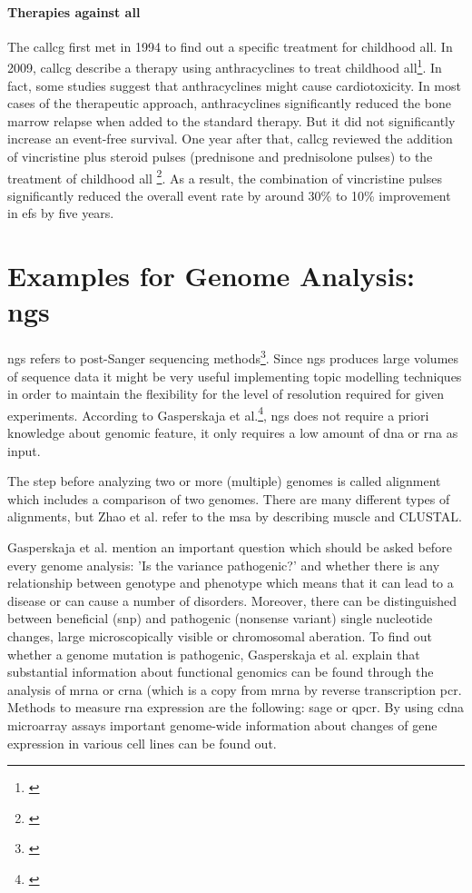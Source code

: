 \paragraph{Therapies against \gls{all}}
The \gls{callcg} first met in 1994 to find out a specific treatment for childhood \gls{all}.
In 2009, \gls{callcg} describe a therapy using anthracyclines to treat childhood \gls{all}\footnote{\autocite{callcg_2009}}. In fact, some studies suggest that anthracyclines might cause cardiotoxicity. In most cases of the therapeutic approach, anthracyclines significantly reduced the bone marrow relapse when added to the standard therapy. But it did not significantly increase an event-free survival.
One year after that, \gls{callcg} reviewed the addition of vincristine plus steroid pulses (prednisone and prednisolone pulses) to the treatment of childhood \gls{all} \footnote{\autocite{callcg_2010}}. As a result, the combination of vincristine pulses significantly reduced the overall event rate by around 30\% to 10\% improvement in \gls{efs} by  five years.

\section{Examples for Genome Analysis: \gls{ngs}}\label{genome_analysis}
\gls{ngs} refers to post-Sanger sequencing methods\footnote{\autocite{zhao_2016}}. Since \gls{ngs} produces large volumes of sequence data it might be very useful implementing topic modelling techniques in order to maintain the flexibility for the level of resolution required for given experiments.  
According to Gasperskaja et al.\footnote{\autocite{gasperskaja_2017}}, \gls{ngs} does not require a priori knowledge about genomic feature, it only requires a low amount of \gls{dna} or \gls{rna} as input.

The step before analyzing two or more (multiple) genomes is called alignment which includes a comparison of two genomes. There are many different types of alignments, but Zhao et al. refer to the \gls{msa} by describing \gls{muscle} and CLUSTAL.

Gasperskaja et al. mention an important question which should be asked before every genome analysis: 'Is the variance pathogenic?' and whether there is any relationship between genotype and phenotype which means that it can lead to a disease or can cause a number of disorders. 
Moreover, there can be distinguished between beneficial (\gls{snp}) and pathogenic (nonsense variant) single nucleotide changes, large microscopically visible or chromosomal aberation. 
To find out whether a genome mutation is pathogenic, Gasperskaja et al. explain that substantial information about functional genomics can be found through the analysis of \gls{mrna} or \gls{crna} (which is a copy from \gls{mrna} by reverse transcription \gls{pcr}.
Methods to measure \gls{rna} expression are the following: \gls{sage} or \gls{qpcr}.
By using \gls{cdna} microarray assays important genome-wide information about changes of gene expression in various cell lines can be found out.

